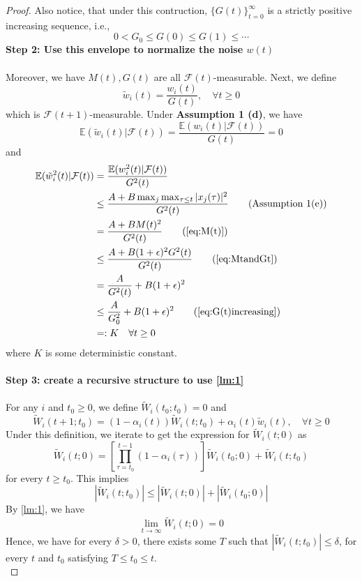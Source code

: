 \begin{proof}
\noindent Also notice, that under this contruction, $\{G(t)\}_{t=0}^\infty$ is a strictly positive increasing sequence, i.e.,
\begin{equation}
   0< G_0\le G(0) \le G(1) \le \cdots
\end{equation}\label{eq:G(t)increasing}
\textbf{Step 2: Use this envelope to normalize the noise $w(t)$}\\
\\
Moreover, we have $M(t),G(t)$ are all $\mathcal{F}(t)$-measurable. Next, we define
$$
\tilde w_i(t) = \frac{w_i(t)}{G(t)},\quad \forall t\ge 0
$$
which is $\mathcal{F}(t+1)$-measurable. Under \textbf{Assumption 1 (d)}, we have
$$
\mathbb{E}(\tilde w_i(t)|\mathcal{F}(t)) = \frac{\mathbb{E}(w_i(t)|\mathcal{F}(t))}{G(t)} = 0
$$
and
\begin{align*}
    \mathbb{E}(\tilde w_i^2(t)|\mathcal{F}(t)) &= \frac{\mathbb{E}(w_i^2(t)|\mathcal{F}(t))}{G^2(t)}\\
    &\le \frac{A + B \max_j\max_{\tau\le t}|x_j(\tau)|^2}{G^2(t)}\tag{Assumption 1(e)}\\
    &= \frac{A + B M(t)^2}{G^2(t)}\tag{\autoref{eq:M(t)}}\\
    &\le \frac{A+B(1+\epsilon)^2G^2(t)}{G^2(t)}\tag{\autoref{eq:MtandGt}}\\
    &= \frac{A}{G^2(t)} + B(1+\epsilon)^2 \\
    &\le \frac{A}{G_0^2} + B(1+\epsilon)^2 \tag{\autoref{eq:G(t)increasing}}\\
    &=:K\quad \forall t\ge 0
\end{align*}
where $K$ is some deterministic constant.\\
\\
\textbf{Step 3: create a recursive structure to use \autoref{lm:1}}\\
\\
For any $i$ and $t_0\ge 0$, we define $\tilde W_i(t_0;t_0) = 0$ and
\begin{equation}\label{eq:tildeW}
    \tilde W_i(t+1; t_0) = (1-\alpha_i(t))\tilde W_i(t;t_0) + \alpha_i(t)\tilde w_i(t),\quad \forall t\ge 0
\end{equation}
\noindent Under this definition, we iterate to get the expression for $\tilde W_i(t;0)$ as
$$
\tilde W_i(t;0) = \left[\prod_{\tau = t_0}^{t-1} (1-\alpha_i(\tau))\right]\tilde W_i(t_0;0) + \tilde W_i(t;t_0)
$$
for every $t\ge t_0$. This implies
$$
|\tilde W_i(t;t_0)|\le |\tilde W_i(t;0)| + |\tilde W_i(t_0;0)|
$$
By \autoref{lm:1}, we have 
$$
\lim_{t\to\infty} \tilde W_i(t;0) = 0
$$
Hence, we have for every $\delta >0$, there exists some $T$ such that $|\tilde W_i(t;t_0)|\le \delta$, for every $t$ and $t_0$ satisfying $T\le t_0\le t$.\\

\end{proof}
